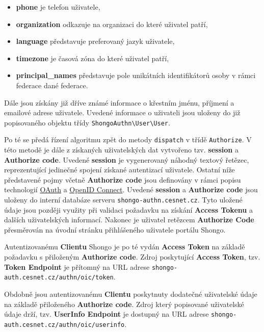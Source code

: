 \documentclass[
  printed, %
  twoside, %
  table,   %
  nolof,     %
  nolot,     %
]{fithesis3}
\begin{document}
\begin{itemize}
    \item \textbf{phone} je telefon uživatele,
    \item \textbf{organization} odkazuje na organizaci do které uživatel patří,
    \item \textbf{language} představuje preferovaný jazyk uživatele,
    \item \textbf{timezone} je časová zóna do které uživatel patří, 
    \item \textbf{principal\_names} představuje pole unikátních identifikátorů osoby v rámci federace dané federace. 
\end{itemize}
Dále jsou získány již dříve známé informace o křestním jménu, příjmení a emailové adrese uživatele. Uvedené informace o uživateli jsou uloženy do již popisovaného objektu třídy \texttt{ShongoAuthn\textbackslash User\textbackslash User}. \par

Po té se předá řízení algoritmu zpět do metody \texttt{dispatch} v třídě \texttt{Authorize}. V této metodě je dále z získaných uživatelských dat vytvořeno tzv. \textbf{session} a \textbf{Authorize code}. Uvedené \textbf{session} je vygenerovaný náhodný textový řetězec, reprezentující jedinečné spojení získané autentizací uživatele. Ostatní níže představené pojmy včetně \textbf{Authorize code} jsou definovány v rámci popisu technologií \hyperref[sec:oauth]{OAuth} a \hyperref[sec:oidc]{OpenID Connect}. Uvedené \textbf{session} a \textbf{Authorize code} jsou uloženy do interní databáze serveru \texttt{shongo-authn.cesnet.cz}. Tyto uložené údaje jsou později využity při validaci požadavku na získání \textbf{Access Tokenu} a dalších uživatelských informací. Nakonec je uživatel retězcem \textbf{Authorize Code} přesměrován na úvodní stránku přihlášeného uživatele portálu Shongo. \par

Autentizovanému \textbf{Clientu} Shongo je po té vydán  \textbf{Access Token} na základě požadavku s přiloženým \textbf{Authorize code}.   
Zdroj poskytující \textbf{Access Token}, tzv. \textbf{Token Endpoint} je přítomný na URL adrese \texttt{shongo-auth.cesnet.cz/authn/oic/token}. \par 

Obdobně jsou autentizovanému \textbf{Clientu} poskytnuty dodatečné uživatelské údaje na základě přiloženého \textbf{Authorize code}. Zdroj který popisované uživatelské údaje drží, tzv. \textbf{UserInfo Endpoint} je dostupný na URL adrese \texttt{shongo-auth.cesnet.cz/authn/oic/userinfo}.  \par 
\end{document}

